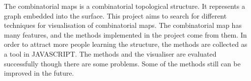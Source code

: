 







\setlength\parindent{0pt} 

%

The combinatorial maps is a combinatorial topological structure. It represents a graph embedded into the surface. This project aims to search for different techniques for visualisation of combinatorial maps. The combinatorial map has many features, and the methods implemented in the project come from them. In order to attract more people learning the structure, the methods are collected as a tool in JAVASCRIPT. The methods and the visualiser are evaluated successfully though there are some problems. Some of the methods still can be improved in the future.
